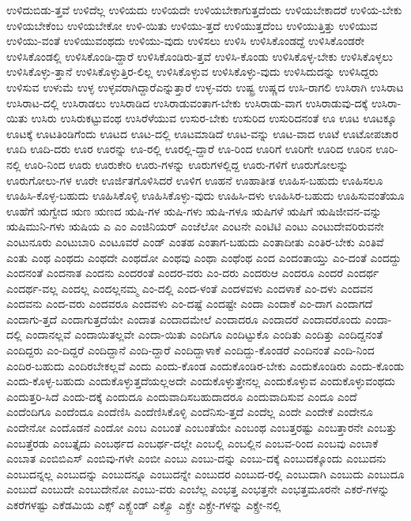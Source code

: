 {ಉಳಿದುಬಿಡು-ತ್ತವೆ
ಉಳಿದೆಲ್ಲ
ಉಳಿಯದು
ಉಳಿಯದೇ
ಉಳಿಯಬೇಕಾಗುತ್ತದೆಂದು
ಉಳಿಯಬೇಕಾದರೆ
ಉಳಿಯ-ಬೇಕು
ಉಳಿಯಬೇಕೆಂಬ
ಉಳಿಯಬೇಕೋ
ಉಳಿ-ಯಿತು
ಉಳಿಯು-ತ್ತದೆ
ಉಳಿಯುತ್ತದೆಂಬ
ಉಳಿಯುತ್ತಿತ್ತು
ಉಳಿಯುವ
ಉಳಿಯು-ವಂತೆ
ಉಳಿಯುವಂಥದು
ಉಳಿಯು-ವುದು
ಉಳಿಸಲು
ಉಳಿಸಿ
ಉಳಿಸಿಕೊಂಡದ್ದೆ
ಉಳಿಸಿಕೊಂಡರೇ
ಉಳಿಸಿಕೊಂಡಲ್ಲಿ
ಉಳಿಸಿಕೊಂಡಿ-ದ್ದಾರೆ
ಉಳಿಸಿಕೊಂಡಿರು-ತ್ತವೆ
ಉಳಿಸಿ-ಕೊಂಡು
ಉಳಿಸಿಕೊಳ್ಳ-ಬೇಕು
ಉಳಿಸಿಕೊಳ್ಳಲು
ಉಳಿಸಿಕೊಳ್ಳು-ತ್ತಾನೆ
ಉಳಿಸಿಕೊಳ್ಳುತ್ತಿರ-ಲಿಲ್ಲ
ಉಳಿಸಿಕೊಳ್ಳುವ
ಉಳಿಸಿಕೊಳ್ಳು-ವುದು
ಉಳಿಸಿದುದನ್ನು
ಉಳಿಸಿದ್ದರು
ಉಳಿಸುವ
ಉಳುಮೆ
ಉಳ್ಳ
ಉಳ್ಳವರಾಗಿದ್ದಾರೆಎನ್ನುತ್ತಾರೆ
ಉಳ್ಳ-ವರು
ಉಷ್ಟ್ರ
ಉಷ್ಣದ
ಉಸಿ-ರಾಗಲಿ
ಉಸಿರಾಗಿ
ಉಸಿರಾಟ
ಉಸಿರಾಟ-ದಲ್ಲಿ
ಉಸಿರಾಡಲು
ಉಸಿರಾಡಿದ
ಉಸಿರಾಡುವಂತಾಗ-ಬೇಕು
ಉಸಿರಾಡು-ವಾಗ
ಉಸಿರಾಡುವು-ದಕ್ಕೆ
ಉಸಿರಾ-ಯಿತು
ಉಸಿರು
ಉಸಿರುಕಟ್ಟುವಂಥ
ಉಸಿರೆಳೆಯುವ
ಉಸುರ-ಬೇಕು
ಉಸುರಿದ
ಉಸುರಿದನಂತೆ
ಊ
ಊಟ
ಊಟಕ್ಕೂ
ಊಟಕ್ಕೆ
ಊಟತಿಂಡಿಗೆಂದು
ಊಟದ
ಊಟ-ದಲ್ಲಿ
ಊಟಮಾಡಿದೆ
ಊಟ-ವನ್ನು
ಊಟ-ವಾದ
ಊಟೆ
ಊಟೋಪಚಾರ
ಊದಿ
ಊದಿ-ದರು
ಊರ
ಊರನ್ನು
ಊ-ರಲ್ಲಿ
ಊರಲ್ಲಿ-ದ್ದಾರೆ
ಊ-ರಿಂದ
ಊರಿಗೆ
ಊರಿಗೇ
ಊರಿದ
ಊರಿನ
ಊರಿ-ನಲ್ಲಿ
ಊರಿ-ನಿಂದ
ಊರು
ಊರುಕೇರಿ
ಊರು-ಗಳನ್ನು
ಊರುಗಳಲ್ಲಿದ್ದ
ಊರು-ಗಳಿಗೆ
ಊರುಗೋಲನ್ನು
ಊರುಗೋಲು-ಗಳ
ಊರೇ
ಊರ್ಜಿತಗೊಳಿಸಿದರೆ
ಊಳಿಗ
ಊಹನೆ
ಊಹಾತೀತ
ಊಹಿಸ-ಬಹುದು
ಊಹಿಸಲೂ
ಊಹಿಸಿ-ಕೊಳ್ಳ-ಬಹುದು
ಊಹಿಸಿಕೊಳ್ಳಿ
ಊಹಿಸಿಕೊಳ್ಳು-ವುದು
ಊಹಿಸಿ-ದಳು
ಊಹಿಸಿರ-ಬಹುದು
ಊಹಿಸುವಂತೆಯೂ
ಊಹೆಗೆ
ಋಗ್ವೇದ
ಋಣ
ಋಣದ
ಋಷಿ-ಗಳ
ಋಷಿ-ಗಳು
ಋಷಿ-ಗಳೂ
ಋಷಿಗಳೆ
ಋಷಿಗೆ
ಋಷಿಜೀವನ-ವನ್ನು
ಋಷಿಮುನಿ-ಗಳು
ಋಷಿಯ
ಎ
ಎಂ
ಎಂಜಿನಿಯರ್
ಎಂಜೆಲೋ
ಎಂಟನೇ
ಎಂಟಿಟಿ
ಎಂಟು
ಎಂಟುದೇವರಿರುವನೇ
ಎಂಟುನೂರು
ಎಂಟುಬಾರಿ
ಎಂಟೂವರೆ
ಎಂಡ್
ಎಂತಹ
ಎಂತಾಗ-ಬಹುದು
ಎಂತಾದೀತು
ಎಂತಿರ-ಬೇಕು
ಎಂತಿವೆ
ಎಂತು
ಎಂಥ
ಎಂಥದು
ಎಂಥದೇ
ಎಂಥದೋ
ಎಂಥವು
ಎಂಥಾ
ಎಂಥೆಂಥ
ಎಂದ
ಎಂದಂತಾಯ್ತು
ಎಂ-ದಂತೆ
ಎಂದದ್ದು
ಎಂದನಂತೆ
ಎಂದನಾತ
ಎಂದನು
ಎಂದರಂತೆ
ಎಂದರ-ವರು
ಎಂ-ದರು
ಎಂದರುಆ
ಎಂದರೂ
ಎಂದರೆ
ಎಂದರ್ಥ
ಎಂದರ್ಥ-ವಲ್ಲ
ಎಂದಲ್ಲ
ಎಂದಲ್ಲನಮ್ಮ
ಎಂ-ದಲ್ಲಿ
ಎಂದ-ಳಂತೆ
ಎಂದಳವಳು
ಎಂದಳಾಕೆ
ಎಂ-ದಳು
ಎಂದವನ
ಎಂದವನು
ಎಂದ-ವರು
ಎಂದವರೂ
ಎಂದವಳು
ಎಂ-ದಷ್ಟೆ
ಎಂದಷ್ಟೇ
ಎಂದಾ
ಎಂದಾಕೆ
ಎಂ-ದಾಗ
ಎಂದಾಗದೆ
ಎಂದಾಗು-ತ್ತದೆ
ಎಂದಾಗುತ್ತದೆಯೇ
ಎಂದಾತ
ಎಂದಾದಮೇಲೆ
ಎಂದಾದರೂ
ಎಂದಾದರೆ
ಎಂದಾದರೊಂದು
ಎಂದಾ-ದಲ್ಲಿ
ಎಂದಾನಲ್ಲವೆ
ಎಂದಾಯಿತಲ್ಲವೇ
ಎಂದಾ-ಯಿತು
ಎಂದಿಗೂ
ಎಂದಿಟ್ಟುಕೊ
ಎಂದಿತು
ಎಂದಿತ್ತು
ಎಂದಿದ್ದನಂತೆ
ಎಂದಿದ್ದರು
ಎಂ-ದಿದ್ದರೆ
ಎಂದಿದ್ದಾನೆ
ಎಂದಿ-ದ್ದಾರೆ
ಎಂದಿದ್ದಾಳಾಕೆ
ಎಂದಿದ್ದು-ಕೊಂಡರೆ
ಎಂದಿನಂತೆ
ಎಂದಿ-ನಿಂದ
ಎಂದಿರ-ಬಹುದು
ಎಂದಿರಬೇಕಲ್ಲವೆ
ಎಂದು
ಎಂದು-ಕೊಂಡ
ಎಂದುಕೊಂಡಿರ-ಬೇಕು
ಎಂದುಕೊಂಡಿರು
ಎಂದು-ಕೊಂಡು
ಎಂದು-ಕೊಳ್ಳ-ಬಹುದು
ಎಂದುಕೊಳ್ಳುತ್ತದೆಯಲ್ಲಅದೇ
ಎಂದುಕೊಳ್ಳುತ್ತೇನಲ್ಲ
ಎಂದುಕೊಳ್ಳುವ
ಎಂದುಕೊಳ್ಳುವಂಥದು
ಎಂದುತ್ತರಿ-ಸಿದೆ
ಎಂದು-ದಕ್ಕೆ
ಎಂದುದೂ
ಎಂದುವಾದಿಸಬಹುದಾದರೂ
ಎಂದುವಾದಿಸುವ
ಎಂದೂ
ಎಂದೆ
ಎಂದೆಂದಿಗೂ
ಎಂದೆಂದೂ
ಎಂದೆಣಿಸಿ
ಎಂದೆಣಿಸಿಕೊಳ್ಳಿ
ಎಂದೆನಿಸು-ತ್ತದೆ
ಎಂದೆಲ್ಲ
ಎಂದೇ
ಎಂದೇಕೆ
ಎಂದೇನೂ
ಎಂದೇನೋ
ಎಂದೊಡನೆ
ಎಂದೋ
ಎಂಬ
ಎಂಬಂತೆ
ಎಂಬಂತೆಯೇ
ಎಂಬಂಥ
ಎಂಬತ್ತರಷ್ಟು
ಎಂಬತ್ತಾರನೇ
ಎಂಬತ್ತು
ಎಂಬತ್ತೆರಡು
ಎಂಬತ್ತೈದು
ಎಂಬರ್ಥದ
ಎಂಬರ್ಥ-ದಲ್ಲೇ
ಎಂಬಲ್ಲಿ
ಎಂಬಲ್ಲಿನ
ಎಂಬವ-ರಿಂದ
ಎಂಬವು
ಎಂಬಾಕೆ
ಎಂಬಾತ
ಎಂಬಿಬಿಎಸ್
ಎಂಬಿವು-ಗಳೇ
ಎಂಬೀ
ಎಂಬು
ಎಂಬು-ದನ್ನು
ಎಂಬು-ದಕ್ಕೆ
ಎಂಬುದಕ್ಕೊಂದು
ಎಂಬುದನು
ಎಂಬುದನ್ನಲ್ಲ
ಎಂಬುದನ್ನು
ಎಂಬುದನ್ನೂ
ಎಂಬುದನ್ನೇ
ಎಂಬುದರ
ಎಂಬುದ-ರಲ್ಲಿ
ಎಂಬುದಾಗಿ
ಎಂಬುದು
ಎಂಬುದೂ
ಎಂಬುದೆ
ಎಂಬುದೇ
ಎಂಬುದೇನೋ
ಎಂಬು-ವರು
ಎಂಬೆಲ್ಲ
ಎಂಭತ್ತ
ಎಂಭತ್ತನೇ
ಎಂಭತ್ತಮೂರನೇ
ಎಕರೆ-ಗಳನ್ನು
ಎಕರೆಗಳಷ್ಟು
ಎಕೆಡಮಿಯ
ಎಕ್ಸ್
ಎಕ್ಸ್ಟೆಂಡ್
ಎಕ್ಸ್ಪೊ
ಎಕ್ಸ್ರೇ
ಎಕ್ಸ್ರೇ-ಗಳನ್ನು
ಎಕ್ಸ್ರೇ-ನಲ್ಲಿ
}
